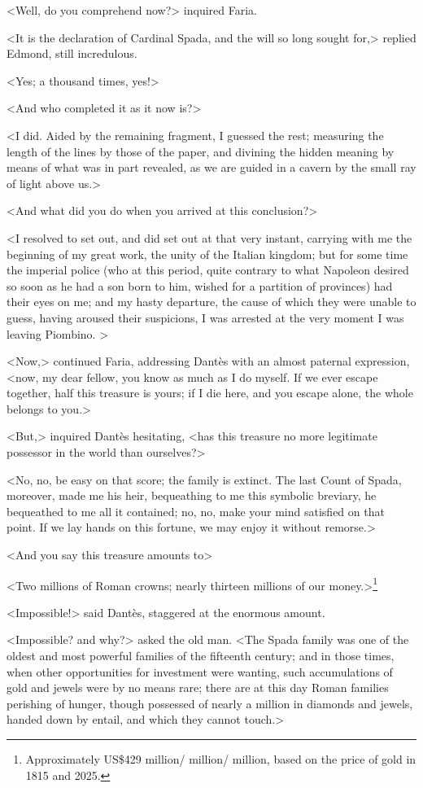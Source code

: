 <Well, do you comprehend now?> inquired Faria. 

 <It is the declaration of Cardinal Spada, and the will so long sought for,> replied Edmond, still incredulous. 

 <Yes; a thousand times, yes!> 

 <And who completed it as it now is?> 

 <I did. Aided by the remaining fragment, I guessed the rest; measuring the length of the lines by those of the paper, and divining the hidden meaning by means of what was in part revealed, as we are guided in a cavern by the small ray of light above us.> 

 <And what did you do when you arrived at this conclusion?> 

 <I resolved to set out, and did set out at that very instant, carrying with me the beginning of my great work, the unity of the Italian kingdom; but for some time the imperial police (who at this period, quite contrary to what Napoleon desired so soon as he had a son born to him, wished for a partition of provinces) had their eyes on me; and my hasty departure, the cause of which they were unable to guess, having aroused their suspicions, I was arrested at the very moment I was leaving Piombino. >

 <Now,> continued Faria, addressing Dantès with an almost paternal expression, <now, my dear fellow, you know as much as I do myself. If we ever escape together, half this treasure is yours; if I die here, and you escape alone, the whole belongs to you.> 

 <But,> inquired Dantès hesitating, <has this treasure no more legitimate possessor in the world than ourselves?> 

 <No, no, be easy on that score; the family is extinct. The last Count of Spada, moreover, made me his heir, bequeathing to me this symbolic breviary, he bequeathed to me all it contained; no, no, make your mind satisfied on that point. If we lay hands on this fortune, we may enjoy it without remorse.> 

 <And you say this treasure amounts to\longdash> 

 <Two millions of Roman crowns; nearly thirteen millions of our money.>\footnote{Approximately US\$429 million/ million/ million, based on the price of gold in 1815 and 2025.} 

 <Impossible!> said Dantès, staggered at the enormous amount. 

 <Impossible? and why?> asked the old man. <The Spada family was one of the oldest and most powerful families of the fifteenth century; and in those times, when other opportunities for investment were wanting, such accumulations of gold and jewels were by no means rare; there are at this day Roman families perishing of hunger, though possessed of nearly a million in diamonds and jewels, handed down by entail, and which they cannot touch.> 

